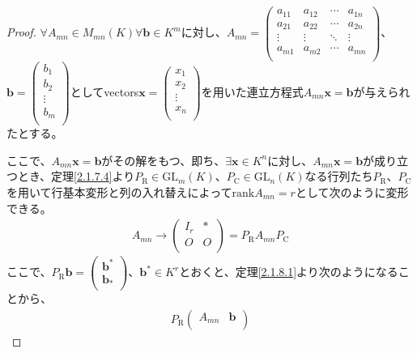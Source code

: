 \documentclass[dvipdfmx]{jsarticle}
\begin{document}
\begin{proof}
$\forall A_{mn} \in M_{mn}(K)\forall\mathbf{b} \in K^{m}$に対し、$A_{mn} = \begin{pmatrix}
a_{11} & a_{12} & \cdots & a_{1n} \\
a_{21} & a_{22} & \cdots & a_{2n} \\
 \vdots & \vdots & \ddots & \vdots \\
a_{m1} & a_{m2} & \cdots & a_{mn} \\
\end{pmatrix}$、$\mathbf{b} = \begin{pmatrix}
b_{1} \\
b_{2} \\
 \vdots \\
b_{m} \\
\end{pmatrix}$としてvectors$\mathbf{x} = \begin{pmatrix}
x_{1} \\
x_{2} \\
 \vdots \\
x_{n} \\
\end{pmatrix}$を用いた連立方程式$A_{mn}\mathbf{x} = \mathbf{b}$が与えられたとする。\par
ここで、$A_{mn}\mathbf{x} = \mathbf{b}$がその解をもつ、即ち、$\exists\mathbf{x} \in K^{n}$に対し、$A_{mn}\mathbf{x} = \mathbf{b}$が成り立つとき、定理\ref{2.1.7.4}より$P_{\mathrm{R}} \in {\mathrm{GL}}_{m}(K)$、$P_{\mathrm{C}} \in {\mathrm{GL}}_{n}(K)$なる行列たち$P_{\mathrm{R}}$、$P_{\mathrm{C}}$を用いて行基本変形と列の入れ替えによって${\mathrm{rank}}A_{mn} = r$として次のように変形できる。
\begin{align*}
A_{mn} \rightarrow \begin{pmatrix}
I_{r} & * \\
O & O \\
\end{pmatrix} = P_{\mathrm{R}}A_{mn}P_{\mathrm{C}}
\end{align*}
ここで、$P_{\mathrm{R}}\mathbf{b} = \begin{pmatrix}
\mathbf{b}^{*} \\
\mathbf{b}_{*} \\
\end{pmatrix}$、$\mathbf{b}^{*} \in K^{r}$とおくと、定理\ref{2.1.8.1}より次のようになることから、
\begin{align*}
P_{\mathrm{R}}\begin{pmatrix}
A_{mn} & \mathbf{b} \\

\end{pmatrix}
\end{align*}
\end{proof}
\end{document}
